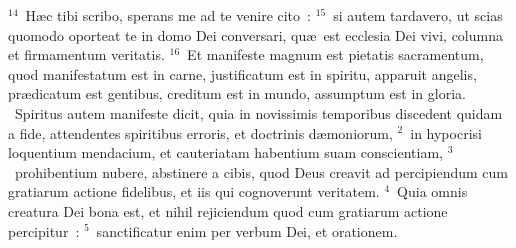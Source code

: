 ${}^{14}$~H\ae c tibi scribo, sperans me ad te venire cito~:
${}^{15}$~si autem tardavero, ut scias quomodo oporteat te in domo Dei conversari, qu\ae\ est ecclesia Dei vivi, columna et firmamentum veritatis.
${}^{16}$~Et manifeste magnum est pietatis sacramentum, quod manifestatum est in carne, justificatum est in spiritu, apparuit angelis, pr\ae dicatum est gentibus, creditum est in mundo, assumptum est in gloria.
~\lettrine[lines=10,image=true,loversize=0.05,lraise=-0.03]{S}{}piritus autem manifeste dicit, quia in novissimis temporibus discedent quidam a fide, attendentes spiritibus erroris, et doctrinis d\ae moniorum,
${}^{2}$~in hypocrisi loquentium mendacium, et cauteriatam habentium suam conscientiam,
${}^{3}$~prohibentium nubere, abstinere a cibis, quod Deus creavit ad percipiendum cum gratiarum actione fidelibus, et iis qui cognoverunt veritatem.
${}^{4}$~Quia omnis creatura Dei bona est, et nihil rejiciendum quod cum gratiarum actione percipitur~:
${}^{5}$~sanctificatur enim per verbum Dei, et orationem.



